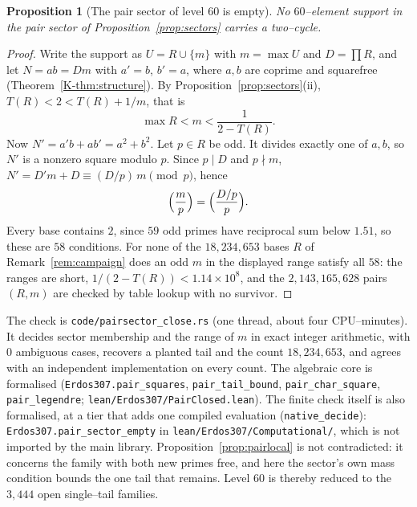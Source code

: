 \documentclass[11pt]{article}
\newtheorem{proposition}[theorem]{Proposition}
\theoremstyle{definition}
\begin{document}
\begin{proposition}[The pair sector of level $60$ is empty]\label{prop:pairclosed}
No $60$--element support in the pair sector of Proposition~\ref{prop:sectors} carries a two--cycle.
\end{proposition}
\begin{proof}
Write the support as $U=R\cup\{m\}$ with $m=\max U$ and $D=\prod R$, and let $N=ab=Dm$ with $a'=b$, $b'=a$, where $a,b$
are coprime and squarefree (Theorem~\ref{K-thm:structure}). By Proposition~\ref{prop:sectors}\textup{(ii)},
$T(R)<2<T(R)+1/m$, that is
\[ \max R<m<\frac{1}{2-T(R)}. \]
Now $N'=a'b+ab'=a^2+b^2$. Let $p\in R$ be odd. It divides exactly one of $a,b$, so $N'$ is a nonzero square modulo $p$.
Since $p\mid D$ and $p\nmid m$, $N'=D'm+D\equiv(D/p)\,m\pmod p$, hence
\[ \Bigl(\frac{m}{p}\Bigr)=\Bigl(\frac{D/p}{p}\Bigr). \]
Every base contains $2$, since $59$ odd primes have reciprocal sum below $1.51$, so these are $58$ conditions. For none
of the $18{,}234{,}653$ bases $R$ of Remark~\ref{rem:campaign} does an odd $m$ in the displayed range satisfy all $58$:
the ranges are short, $1/(2-T(R))<1.14\times10^{8}$, and the $2{,}143{,}165{,}628$ pairs $(R,m)$ are checked by table
lookup with no survivor.
\end{proof}

The check is \texttt{code/pairsector\_close.rs} (one thread, about four CPU--minutes). It decides sector membership and
the range of $m$ in exact integer arithmetic, with $0$ ambiguous cases, recovers a planted tail and the count
$18{,}234{,}653$, and agrees with an independent implementation on every count. The algebraic core is formalised
(\texttt{Erdos307.pair\_squares}, \texttt{pair\_tail\_bound}, \texttt{pair\_char\_square}, \texttt{pair\_legendre};
\texttt{lean/Erdos307/PairClosed.lean}). The finite check itself is also formalised, at a tier that adds one compiled evaluation (\texttt{native\_decide}): \texttt{Erdos307.pair\_sector\_empty} in \texttt{lean/Erdos307/Computational/}, which is not imported by the main library. Proposition~\ref{prop:pairlocal} is not contradicted: it concerns the family
with both new primes free, and here the sector's own mass condition bounds the one tail that remains. Level $60$ is
thereby reduced to the $3{,}444$ open single--tail families.
\end{document}

